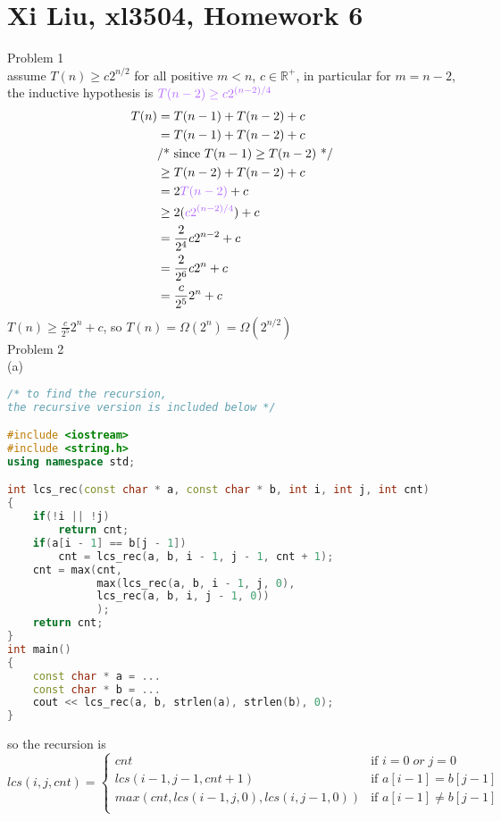 \documentclass[12pt,border=4pt,multi]{article}%
\begin{document}
\section*{Xi Liu, xl3504, Homework 6}
Problem 1\\
assume $T(n) \geq c2^{n/2}$ for all positive $m < n$, $c \in \mathbb{R^+}$, in particular for $m = n - 2$, the inductive hypothesis is $\textcolor{orchid}{T(n - 2) \geq c2^{(n - 2)/4}}$\\
\begin{align*}
T(n) &= T(n - 1) + T(n - 2) + c\\
&= T(n - 1) + T(n - 2) + c\\
&\text{/* since } T(n - 1) \geq T(n - 2) \text{ */}\\
&\geq T(n - 2) + T(n - 2) + c\\
&= 2\textcolor{orchid}{T(n - 2)} + c\\
&\geq 2(\textcolor{orchid}{c2^{(n - 2)/4}}) + c\\
&= \frac{2}{2^4} c2^{n - 2} + c\\
&= \frac{2}{2^6}c2^n + c\\
&= \frac{c}{2^5}2^n + c\\
\end{align*}
$T(n) \geq \frac{c}{2^5}2^n + c$, so $T(n) = \Omega(2^n) = \Omega(2^{n/2})$\\
\newpage
\noindent
Problem 2\\
(a)
\begin{lstlisting}[language = c++]
/* to find the recursion,
the recursive version is included below */

#include <iostream>
#include <string.h>
using namespace std;

int lcs_rec(const char * a, const char * b, int i, int j, int cnt)
{
    if(!i || !j)
        return cnt;
    if(a[i - 1] == b[j - 1])
        cnt = lcs_rec(a, b, i - 1, j - 1, cnt + 1);
    cnt = max(cnt, 
              max(lcs_rec(a, b, i - 1, j, 0),
              lcs_rec(a, b, i, j - 1, 0))
              );
    return cnt;
}
int main()
{
    const char * a = ...
    const char * b = ...
    cout << lcs_rec(a, b, strlen(a), strlen(b), 0);
}
\end{lstlisting}
so the recursion is\\
$\boxed{lcs(i, j, cnt) 
= \begin{cases}
cnt & \text{if } i = 0 \;or\; j = 0\\
lcs(i - 1, j - 1, cnt + 1) & \text{if } a[i - 1] = b[j - 1]\\
max(cnt, lcs(i - 1, j, 0), lcs(i, j - 1, 0)) & \text{if } a[i - 1] \not= b[j - 1]\\
\end{cases}}$
\end{document}
